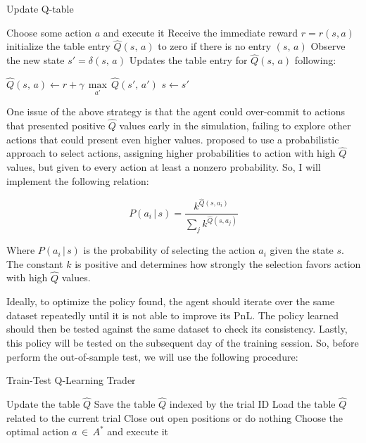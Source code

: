 \documentclass[a4paper]{article}
\begin{document}
\begin{algorithm}
\caption{Update Q-table}\label{alg:qtable}
\begin{algorithmic}[1]
  \State Choose some action $a$ and execute it
  \State Receive the immediate reward $r = r(s, a)$
  \State initialize the table entry $\hat{Q}(s, \, a)$ to zero if there is no entry $(s, \, a)$
  \State Observe the new state $s' = \delta(s, \,a)$
  \State Updates the table entry for $\hat{Q}(s, \, a)$ following:

    \do $\hat{Q}(s, \, a) \leftarrow r + \gamma \, \underset{a'}{\max}\, \hat{Q}(s', \, a')$
  \State $s \leftarrow s'$
\EndLoop
\end{algorithmic}
\end{algorithm}

One issue of the above strategy is that the agent could over-commit to actions that presented positive $\hat{Q}$ values early in the simulation, failing to explore other actions that could present even higher values. \cite{Mitchell} proposed to use a probabilistic approach to select actions, assigning higher probabilities to action with high $\hat{Q}$ values, but given to every action at least a nonzero probability. So, I will implement the following relation:

$$P(a_i\, | \,s ) = \frac{k ^{\hat{Q}(s, a_i)}}{\sum_j k^{\hat{Q}(s, a_j)}}$$

Where $P(a_i\, | \,s )$ is the probability of selecting the action $a_i$ given the state $s$. The constant $k$ is positive and determines how strongly the selection favors action with high $\hat{Q}$ values.

Ideally, to optimize the policy found, the agent should iterate over the same dataset repeatedly until it is not able to improve its PnL. The policy learned should then be tested against the same dataset to check its consistency. Lastly, this policy will be tested on the subsequent day of the training session. So, before perform the out-of-sample test, we will use the following procedure:

\begin{algorithm}
\caption{Train-Test Q-Learning Trader}\label{alg:qtrader}
\begin{algorithmic}[1]
    \State Update the table $\hat{Q}$
  \EndLoop
  \State Save the table $\hat{Q}$ indexed by the trial ID
\EndLoop
{}
  \State Load the table $\hat{Q}$ related to the current trial
      	\State Close out open positions or do nothing
      \Else
        \State Choose the optimal action $a \, \in \, A^{*}$ and execute it
      \EndIf
    \EndLoop
  \EndLoop
\EndLoop
\end{algorithmic}
\end{algorithm}
\end{document}
